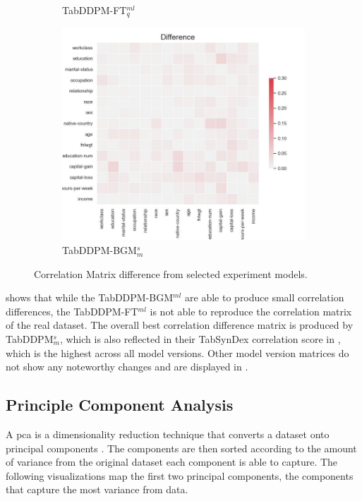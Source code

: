 \begin{figure}[h]
\begin{subfigure}{0.3\textwidth}
		\caption{TabDDPM-FT$^{ml}_q$}
	\end{subfigure}
	\hfill
	\begin{subfigure}{0.3\textwidth}
		\includegraphics[width=\textwidth]{images/correlation_difference/tab-ddpm-bgm-simTune-minmax.jpg}
		\caption{TabDDPM-BGM$^{s}_m$}
	\end{subfigure}
	\caption[Correlation plots Experiment Models]{Correlation Matrix difference from selected experiment models.}
	\label{fig:corr_diffusion}
\end{figure}



 shows that while the TabDDPM-BGM$^{ml}$ are able to produce small correlation differences, the TabDDPM-FT$^{ml}$ is not able to reproduce
the correlation matrix of the real dataset.
The overall best correlation difference matrix is produced by TabDDPM$^{s}_m$, which is also reflected in their TabSynDex correlation score in , which is the highest across all \gls{model} versions.
Other \gls{model} version matrices do not show any noteworthy changes and are displayed in .

\subsection{Principle Component Analysis}
\label{ch:results-pca}

A \gls{pca} is a dimensionality reduction technique that converts a dataset onto principal components \cite{brenninkmeijer2019GenerationEvaluationTabular}.
The components are then sorted according to the amount of variance from the original dataset each component is able to capture.
The following visualizations map the first two principal components, \ie the components that capture the most variance from data.


